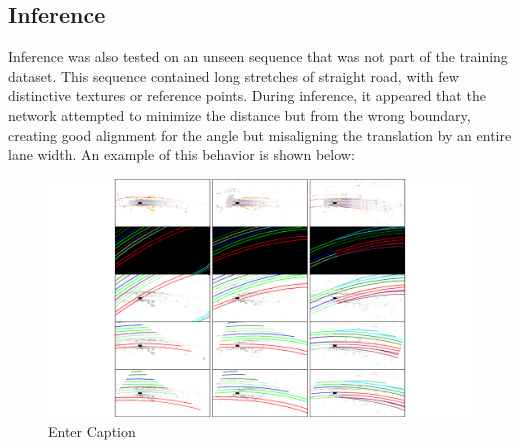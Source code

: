\subsection{Inference}
Inference was also tested on an unseen sequence that was not part of the training dataset. This sequence contained long stretches of straight road, with few distinctive textures or reference points. During inference, it appeared that the network attempted to minimize the distance but from the wrong boundary, creating good alignment for the angle but misaligning the translation by an entire lane width. An example of this behavior is shown below:
\begin{figure}[H]
    \centering
    \includegraphics[width=1\linewidth]{Untitled 2.pdf}
    \caption{Enter Caption}
    \label{fig:enter-label}
\end{figure}